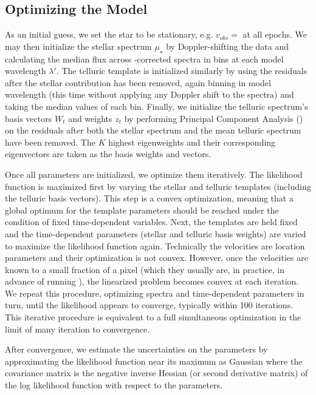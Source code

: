 \documentclass[modern]{aastex62}
\begin{document}
\subsection{Optimizing the Model}
\label{s:optimizing}

As an initial guess, we set the star to be stationary, e.g. $v_{obs} = $ \BERV at all epochs. 
We may then initialize the stellar spectrum $\mu_{\star}$ by Doppler-shifting the data and calculating the median flux across \BERV-corrected spectra in bins at each model wavelength $\lambda'$. 
The telluric template is initialized similarly by using the residuals after the stellar contribution has been removed, again binning in model wavelength (this time without applying any Doppler shift to the spectra) and taking the median values of each bin. 
Finally, we initialize the telluric spectrum's basis vectors $W_t$ and weights $z_t$ by performing Principal Component Analysis () on the residuals after both the stellar spectrum and the mean telluric spectrum have been removed. 
The $K$ highest eigenweights and their corresponding eigenvectors are taken as the basis weights and vectors. 

Once all parameters are initialized, we optimize them iteratively. 
The likelihood function is maximized first by varying the stellar and telluric templates (including the telluric basis vectors). 
This step is a convex optimization, meaning that a global optimum for the template parameters should be reached under the condition of fixed time-dependent variables. 
Next, the templates are held fixed and the time-dependent parameters (stellar \RVs and telluric basis weights) are varied to maximize the likelihood function again. 
Technically the velocities are location parameters and their optimization is not convex.
However, once the velocities are known to a small fraction of a pixel (which they usually are, in practice, in advance of running \wobble), the linearized problem becomes convex at each iteration.
We repeat this procedure, optimizing spectra and time-dependent parameters in turn, until the likelihood appears to converge, typically within 100 iterations.
This iterative procedure is equivalent to a full simultaneous optimization in the limit of many iteration to convergence.

After convergence, we estimate the uncertainties on the parameters by
approximating the likelihood function near its maximum as Gaussian where the
covariance matrix is the negative inverse Hessian (or second derivative
matrix) of the log likelihood function with respect to the parameters.
\end{document}
